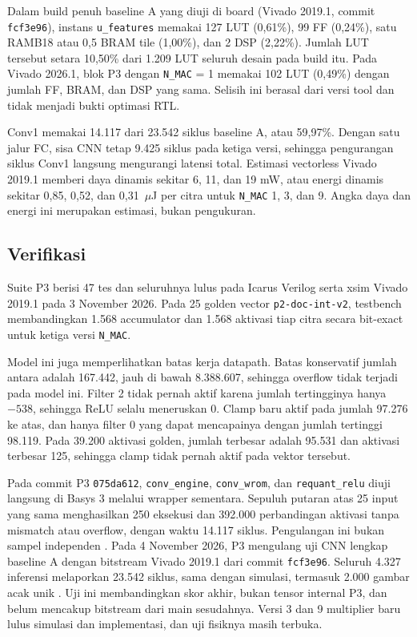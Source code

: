 \documentclass[11pt,a4paper]{article}
\begin{document}
Dalam build penuh baseline A yang diuji di board (Vivado 2019.1, commit
\texttt{fcf3e96}), instans \texttt{u\_features} memakai 127 LUT (0,61\%), 99 FF
(0,24\%), satu RAMB18 atau 0,5 BRAM tile (1,00\%), dan 2 DSP (2,22\%). Jumlah
LUT tersebut setara 10,50\% dari 1.209 LUT seluruh desain pada build itu. Pada
Vivado 2026.1, blok P3 dengan \texttt{N\_MAC} = 1 memakai 102 LUT (0,49\%)
dengan jumlah FF, BRAM, dan DSP yang sama. Selisih ini berasal dari versi tool
dan tidak menjadi bukti optimasi RTL.

Conv1 memakai 14.117 dari 23.542 siklus baseline A, atau 59,97\%. Dengan satu
jalur FC, sisa CNN tetap 9.425 siklus pada ketiga versi, sehingga pengurangan
siklus Conv1 langsung mengurangi latensi total. Estimasi vectorless Vivado 2019.1
memberi daya dinamis sekitar 6, 11, dan 19 mW, atau energi dinamis sekitar 0,85,
0,52, dan 0,31~\(\mu\)J per citra untuk \texttt{N\_MAC} 1, 3, dan 9. Angka daya
dan energi ini merupakan estimasi, bukan pengukuran.

\subsection{Verifikasi}
Suite P3 berisi 47 tes dan seluruhnya lulus pada Icarus Verilog serta xsim
Vivado 2019.1 pada 3 November 2026. Pada 25 golden vector
\texttt{p2-doc-int-v2}, testbench membandingkan 1.568 accumulator dan 1.568
aktivasi tiap citra secara bit-exact untuk ketiga versi \texttt{N\_MAC}.

Model ini juga memperlihatkan batas kerja datapath. Batas konservatif jumlah
antara adalah 167.442, jauh di bawah 8.388.607, sehingga overflow tidak terjadi
pada model ini. Filter 2 tidak pernah aktif karena jumlah tertingginya hanya
\(-538\), sehingga ReLU selalu meneruskan 0. Clamp baru aktif pada jumlah 97.276
ke atas, dan hanya filter 0 yang dapat mencapainya dengan jumlah tertinggi
98.119. Pada 39.200 aktivasi golden, jumlah terbesar adalah 95.531 dan aktivasi
terbesar 125, sehingga clamp tidak pernah aktif pada vektor tersebut.

Pada commit P3 \texttt{075da612}, \texttt{conv\_engine}, \texttt{conv\_wrom}, dan
\texttt{requant\_relu} diuji langsung di Basys 3 melalui wrapper sementara.
Sepuluh putaran atas 25 input yang sama menghasilkan 250 eksekusi dan 392.000
perbandingan aktivasi tanpa mismatch atau overflow, dengan waktu 14.117 siklus.
Pengulangan ini bukan sampel independen \cite{repo}. Pada 4 November 2026, P3
mengulang uji CNN lengkap baseline A dengan bitstream Vivado 2019.1 dari commit
\texttt{fcf3e96}. Seluruh 4.327 inferensi melaporkan 23.542 siklus, sama dengan
simulasi, termasuk 2.000 gambar acak unik \cite{pr12}. Uji ini membandingkan
skor akhir, bukan tensor internal P3, dan belum mencakup bitstream dari main
sesudahnya. Versi 3 dan 9 multiplier baru lulus simulasi dan implementasi, dan
uji fisiknya masih terbuka.
\end{document}
